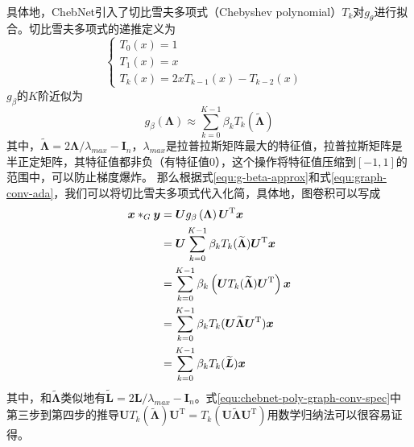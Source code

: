 \documentclass[final]{cvpr}
\begin{document}
具体地，ChebNet引入了切比雪夫多项式（Chebyshev polynomial）$T_k$对$g_\theta$进行拟合。切比雪夫多项式的递推定义为
\begin{equation}\label{equ:cheb-poly-def}
\left\{
    \begin{array}{lr}
        T_0 \left( x \right) = 1 &\\  
        T_1 \left( x \right) = x &\\  
        T_k \left( x \right) = 2xT_{k-1} \left( x \right) 
        -T_{k-2} \left( x \right) &
    \end{array}
\right.
\end{equation}
$g_\beta$的$K$阶近似为
\begin{equation}\label{equ:g-beta-approx}
    g_{\beta}\left( \boldsymbol{\Lambda} \right)
    \approx \sum_{k=0}^{K-1} \beta_k
    T_k \left( \widetilde{\boldsymbol{\Lambda}} \right)
\end{equation}
其中，$\widetilde{\boldsymbol{\Lambda}}=2\boldsymbol{\Lambda} / \lambda_{max} - \boldsymbol{I}_n$，$\lambda_{max}$是拉普拉斯矩阵最大的特征值，拉普拉斯矩阵是半正定矩阵，其特征值都非负（有特征值0），这个操作将特征值压缩到$\left[ -1,1 \right]$的范围中，可以防止梯度爆炸。
那么根据式\ref{equ:g-beta-approx}和式\ref{equ:graph-conv-ada}，我们可以将切比雪夫多项式代入化简，具体地，图卷积可以写成
\begin{align}
    \boldsymbol{x} *_G \boldsymbol{y}
    &= \boldsymbol{U}
    g_{\beta}\left( \boldsymbol{\Lambda} \right)
    \boldsymbol{U}^{\mathrm{T}}\boldsymbol{x} \notag \\
    &=\boldsymbol{U} \sum_{k=0}^{K-1} \beta_k T_k ( \widetilde{\boldsymbol{\Lambda}} )
    \boldsymbol{U}^{\mathrm{T}}\boldsymbol{x} \notag \\
    &=\sum_{k=0}^{K-1} \beta_k
    \left( \boldsymbol{U} T_k ( \widetilde{\boldsymbol{\Lambda}} )
    \boldsymbol{U}^{\mathrm{T}}
    \right) \boldsymbol{x} \notag \\
    &=\sum_{k=0}^{K-1} \beta_k
    T_k ( \boldsymbol{U} \widetilde{\boldsymbol{\Lambda}} 
    \boldsymbol{U}^{\mathrm{T}} )
    \boldsymbol{x} \notag \\    
    &=\sum_{k=0}^{K-1} \beta_k
    T_k ( \widetilde{\boldsymbol{L}} )
    \boldsymbol{x} \label{equ:chebnet-poly-graph-conv-spec}
\end{align}
其中，和$\widetilde{\boldsymbol{\Lambda}}$类似地有$\widetilde{\boldsymbol{L}}=2\boldsymbol{L} / \lambda_{max} -     \boldsymbol{I}_n$。式\ref{equ:chebnet-poly-graph-conv-spec}中第三步到第四步的推导$\boldsymbol{U} T_k ( \widetilde{\boldsymbol{\Lambda}} )
\boldsymbol{U}^{\mathrm{T}}=T_k ( \boldsymbol{U}
\widetilde{\boldsymbol{\Lambda}} \boldsymbol{U}^{\mathrm{T}})
$用数学归纳法可以很容易证得。
\end{document}

